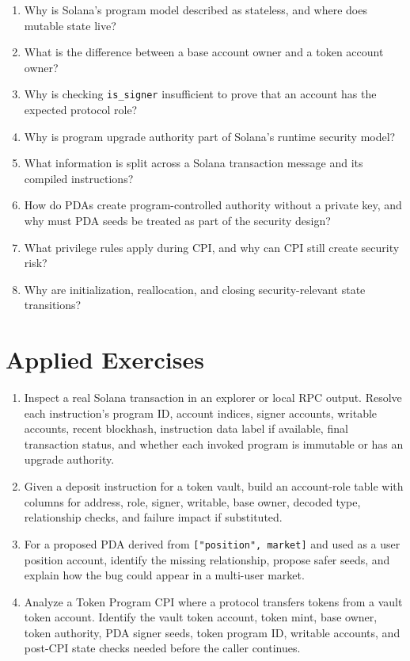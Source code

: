 \begin{enumerate}
\item Why is Solana's program model described as stateless, and where does mutable state live?
\item What is the difference between a base account owner and a token account owner?
\item Why is checking \texttt{is\_signer} insufficient to prove that an account has the expected protocol role?
\item Why is program upgrade authority part of Solana's runtime security model?
\item What information is split across a Solana transaction message and its compiled instructions?
\item How do PDAs create program-controlled authority without a private key, and why must PDA seeds be treated as part of the security design?
\item What privilege rules apply during CPI, and why can CPI still create security risk?
\item Why are initialization, reallocation, and closing security-relevant state transitions?
\end{enumerate}

\section*{Applied Exercises}

\begin{enumerate}
\item Inspect a real Solana transaction in an explorer or local RPC output. Resolve each instruction's program ID, account indices, signer accounts, writable accounts, recent blockhash, instruction data label if available, final transaction status, and whether each invoked program is immutable or has an upgrade authority.

\item Given a deposit instruction for a token vault, build an account-role table with columns for address, role, signer, writable, base owner, decoded type, relationship checks, and failure impact if substituted.

\item For a proposed PDA derived from \texttt{["position", market]} and used as a user position account, identify the missing relationship, propose safer seeds, and explain how the bug could appear in a multi-user market.

\item Analyze a Token Program CPI where a protocol transfers tokens from a vault token account. Identify the vault token account, token mint, base owner, token authority, PDA signer seeds, token program ID, writable accounts, and post-CPI state checks needed before the caller continues.
\end{enumerate}
